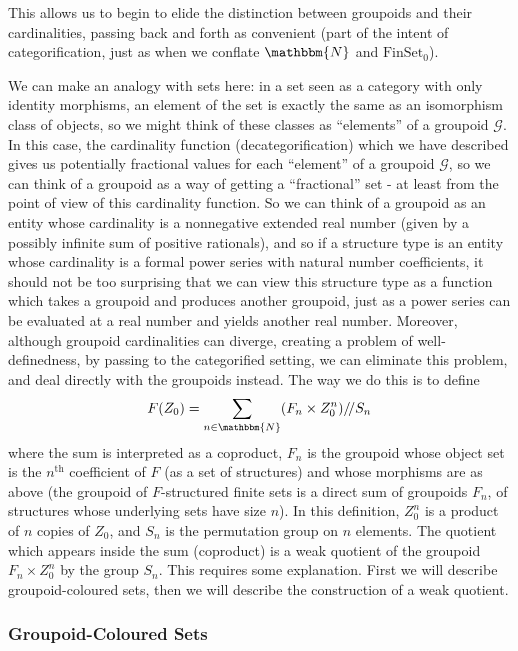 \documentclass{amsart} \usepackage{amsmath,amssymb,bbm}
\newcommand{\opname}[1]{\operatorname{#1}}
\newcommand{\catname}[1]{\boldsymbol{\opname{{#1}}}}
\newcommand{\FSN}{\catname{FinSet_0}}
\begin{document}
This allows us to begin to elide the distinction between groupoids and their
cardinalities, passing back and forth as convenient (part of the intent of
categorification, just as when we conflate $\mathbbm{N}$ and
$\FSN$).

We can make an analogy with sets here: in a set seen as a category
with only identity morphisms, an element of the set is exactly the
same as an isomorphism class of objects, so we might think of these
classes as ``elements'' of a groupoid $\mathcal{G}$.  In this case,
the cardinality function (decategorification) which we have described
gives us potentially fractional values for each ``element'' of a
groupoid $\mathcal{G}$, so we can think of a groupoid as a way of
getting a ``fractional'' set - at least from the point of view of this
cardinality function.  So we can think of a groupoid as an entity
whose cardinality is a nonnegative extended real number (given by a
possibly infinite sum of positive rationals), and so if a structure
type is an entity whose cardinality is a formal power series with
natural number coefficients, it should not be too surprising that we
can view this structure type as a function which takes a groupoid and
produces another groupoid, just as a power series can be evaluated at
a real number and yields another real number.  Moreover, although
groupoid cardinalities can diverge, creating a problem of
well-definedness, by passing to the categorified setting, we can
eliminate this problem, and deal directly with the groupoids instead.
The way we do this is to define
\begin{equation}
  F ( Z_0 ) = \sum_{n \in \mathbbm{N}} (F_n \times Z_0^n)/\,\!\!/S_n
\end{equation} where the sum is interpreted as a coproduct, $F_n$ is
the groupoid whose object set is the $n^{\opname{th}}$ coefficient of
$F$ (as a set of structures) and whose morphisms are as above (the
groupoid of $F$-structured finite sets is a direct sum of groupoids
$F_n$, of structures whose underlying sets have size $n$).  In this
definition, $Z_0^n$ is a product of $n$ copies of $Z_0$, and $S_n$ is
the permutation group on $n$ elements.  The quotient which appears
inside the sum (coproduct) is a weak quotient of the groupoid $F_n
\times Z_0^n$ by the group $S_n$.  This requires some explanation.
First we will describe groupoid-coloured sets, then we will describe
the construction of a weak quotient.

\subsubsection{Groupoid-Coloured Sets}\label{colouredsets}
\end{document}
